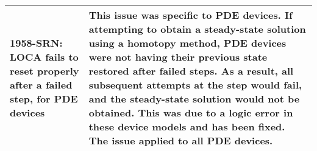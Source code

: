 {\begin{longtable}[h] {>{\raggedright\small}m{2in}|>{\raggedright\let\\\tabularnewline\small}m{3.5in}}
     \textbf{1958-SRN}: LOCA fails to reset properly after a failed step, for
     PDE devices & This issue was specific to PDE devices.  If attempting to
     obtain a steady-state solution using a homotopy method, PDE devices were
     not having their previous state restored after failed steps.  As a result,
     all subsequent attempts at the step would fail, and the steady-state
     solution would not be obtained.  This was due to a logic error in these
     device models and has been fixed.  The issue applied to all PDE devices.
     \\ \hline 

\end{longtable}
}
